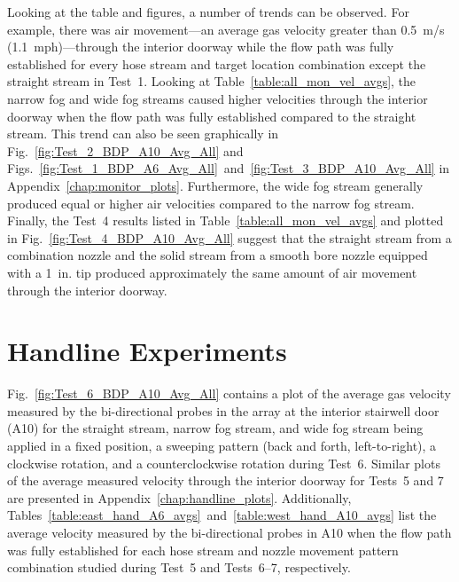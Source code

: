 \documentclass[12pt,oneside]{book}
\begin{document}
Looking at the table and figures, a number of trends can be observed. For example, there was air movement---an average gas velocity greater than 0.5~m/s (1.1~mph)---through the interior doorway while the flow path was fully established for every hose stream and target location combination except the straight stream in Test~1. Looking at Table~\ref{table:all_mon_vel_avgs}, the narrow fog and wide fog streams caused higher velocities through the interior doorway when the flow path was fully established compared to the straight stream. This trend can also be seen graphically in Fig.~\ref{fig:Test_2_BDP_A10_Avg_All} and Figs.~\ref{fig:Test_1_BDP_A6_Avg_All}~and~\ref{fig:Test_3_BDP_A10_Avg_All} in Appendix~\ref{chap:monitor_plots}. Furthermore, the wide fog stream generally produced equal or higher air velocities compared to the narrow fog stream. Finally, the Test~4 results listed in Table~\ref{table:all_mon_vel_avgs} and plotted in Fig.~\ref{fig:Test_4_BDP_A10_Avg_All} suggest that the straight stream from a combination nozzle and the solid stream from a smooth bore nozzle equipped with a 1~in. tip produced approximately the same amount of air movement through the interior doorway.
\FloatBarrier

\section{Handline Experiments}
\label{sec:handline_results}
Fig.~\ref{fig:Test_6_BDP_A10_Avg_All} contains a plot of the average gas velocity measured by the bi-directional probes in the array at the interior stairwell door (A10) for the straight stream, narrow fog stream, and wide fog stream being applied in a fixed position, a sweeping pattern (back and forth, left-to-right), a clockwise rotation, and a counterclockwise rotation during Test~6. Similar plots of the average measured velocity through the interior doorway for Tests~5 and 7 are presented in Appendix~\ref{chap:handline_plots}. Additionally, Tables~\ref{table:east_hand_A6_avgs}~and~\ref{table:west_hand_A10_avgs} list the average velocity measured by the bi-directional probes in A10 when the flow path was fully established for each hose stream and nozzle movement pattern combination studied during Test~5 and Tests~6--7, respectively.
\end{document}
